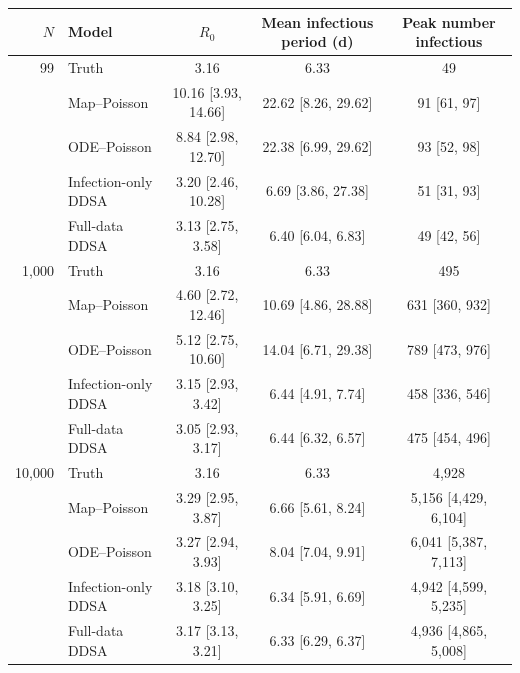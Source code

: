 \begin{tabular}{r l c c c}
\toprule
$N$ & Model & $R_0$ & Mean infectious period (d) & Peak number infectious \\
\midrule
99 & Truth & 3.16 & 6.33 & 49 \\
 & Map--Poisson & 10.16 [3.93, 14.66] & 22.62 [8.26, 29.62] & 91 [61, 97] \\
 & ODE--Poisson & 8.84 [2.98, 12.70] & 22.38 [6.99, 29.62] & 93 [52, 98] \\
 & Infection-only DDSA & 3.20 [2.46, 10.28] & 6.69 [3.86, 27.38] & 51 [31, 93] \\
 & Full-data DDSA & 3.13 [2.75, 3.58] & 6.40 [6.04, 6.83] & 49 [42, 56] \\
\midrule
1{,}000 & Truth & 3.16 & 6.33 & 495 \\
 & Map--Poisson & 4.60 [2.72, 12.46] & 10.69 [4.86, 28.88] & 631 [360, 932] \\
 & ODE--Poisson & 5.12 [2.75, 10.60] & 14.04 [6.71, 29.38] & 789 [473, 976] \\
 & Infection-only DDSA & 3.15 [2.93, 3.42] & 6.44 [4.91, 7.74] & 458 [336, 546] \\
 & Full-data DDSA & 3.05 [2.93, 3.17] & 6.44 [6.32, 6.57] & 475 [454, 496] \\
\midrule
10{,}000 & Truth & 3.16 & 6.33 & 4{,}928 \\
 & Map--Poisson & 3.29 [2.95, 3.87] & 6.66 [5.61, 8.24] & 5{,}156 [4{,}429, 6{,}104] \\
 & ODE--Poisson & 3.27 [2.94, 3.93] & 8.04 [7.04, 9.91] & 6{,}041 [5{,}387, 7{,}113] \\
 & Infection-only DDSA & 3.18 [3.10, 3.25] & 6.34 [5.91, 6.69] & 4{,}942 [4{,}599, 5{,}235] \\
 & Full-data DDSA & 3.17 [3.13, 3.21] & 6.33 [6.29, 6.37] & 4{,}936 [4{,}865, 5{,}008] \\
\bottomrule
\end{tabular}

